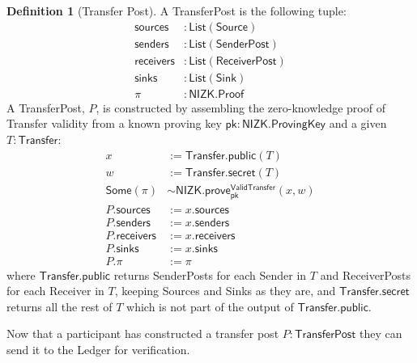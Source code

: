 \documentclass[a4paper]{article}
\theoremstyle{definition}
\newtheorem{definition}{Definition}[subsection]
\newcommand{\Ledger}{{\textsf{Ledger}}}
\newcommand{\List}{{\textsf{List}}}
\newcommand{\NIZK}{{\textsf{NIZK}}}
\newcommand{\Proof}{{\textsf{Proof}}}
\newcommand{\ProvingKey}{{\textsf{ProvingKey}}}
\newcommand{\ReceiverPost}{{\textsf{ReceiverPost}}}
\newcommand{\Receiver}{{\textsf{Receiver}}}
\newcommand{\SenderPost}{{\textsf{SenderPost}}}
\newcommand{\Sender}{{\textsf{Sender}}}
\newcommand{\Sink}{{\textsf{Sink}}}
\newcommand{\Some}{{\textsf{Some}}}
\newcommand{\Source}{{\textsf{Source}}}
\newcommand{\TransferPost}{{\textsf{TransferPost}}}
\newcommand{\Transfer}{{\textsf{Transfer}}}
\newcommand{\ValidTransfer}{{\textsf{ValidTransfer}}}
\newcommand{\pk}{{\textsf{pk}}}
\newcommand{\prove}{{\textsf{prove}}}
\newcommand{\public}{{\textsf{public}}}
\newcommand{\receivers}{{\textsf{receivers}}}
\newcommand{\secret}{{\textsf{secret}}}
\newcommand{\senders}{{\textsf{senders}}}
\newcommand{\sinks}{{\textsf{sinks}}}
\newcommand{\sources}{{\textsf{sources}}}
\begin{document}
\begin{definition}[\Transfer{} Post]
    A \TransferPost{} is the following tuple:
    \begin{align*}
        \sources   &: \List(\Source) \\
        \senders   &: \List(\SenderPost) \\
        \receivers &: \List(\ReceiverPost) \\
        \sinks     &: \List(\Sink) \\
        \pi        &: \NIZK.\Proof
    \end{align*}
    A \TransferPost{}, $P$, is constructed by assembling the zero-knowledge proof of \Transfer{} validity from a known proving key $\pk : \NIZK.\ProvingKey$ and a given $T : \Transfer$:
    \begin{align*}
        x            &:= \Transfer.\public(T) \\
        w            &:= \Transfer.\secret(T) \\
        \Some(\pi)   &\sim \NIZK.\prove^\ValidTransfer_\pk(x, w) \\
        P.\sources   &:= x.\sources \\
        P.\senders   &:= x.\senders \\
        P.\receivers &:= x.\receivers \\
        P.\sinks     &:= x.\sinks \\
        P.\pi        &:= \pi
    \end{align*}
    where $\Transfer.\public$ returns \SenderPost{s} for each \Sender{} in $T$ and \ReceiverPost{s} for each \Receiver{} in $T$, keeping \Source{s} and \Sink{s} as they are, and $\Transfer.\secret$ returns all the rest of $T$ which is not part of the output of $\Transfer.\public$.
\end{definition}

Now that a participant has constructed a transfer post $P : \TransferPost$ they can send it to the \Ledger{} for verification. 
\end{document}
